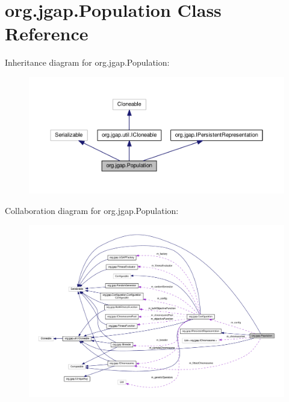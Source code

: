 \hypertarget{classorg_1_1jgap_1_1_population}{\section{org.\-jgap.\-Population Class Reference}
\label{classorg_1_1jgap_1_1_population}
}


Inheritance diagram for org.\-jgap.\-Population\-:
\nopagebreak
\begin{figure}[H]
\begin{center}
\leavevmode
\includegraphics[width=350pt]{classorg_1_1jgap_1_1_population__inherit__graph}
\end{center}
\end{figure}


Collaboration diagram for org.\-jgap.\-Population\-:
\nopagebreak
\begin{figure}[H]
\begin{center}
\leavevmode
\includegraphics[width=350pt]{classorg_1_1jgap_1_1_population__coll__graph}
\end{center}
\end{figure}
